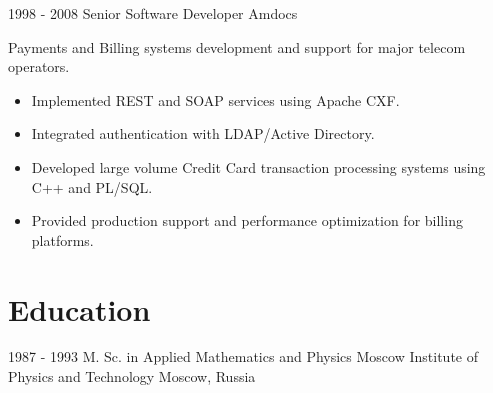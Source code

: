 \documentclass[10pt,a4paper,sans]{moderncv}   %
\begin{document}
\cventry
  {1998 - 2008}
  {Senior Software Developer}
  {Amdocs}
  {}{}
  {
    \vspace{0.5em}
    Payments and Billing systems development and support for major telecom operators.
    \begin{itemize}
      \item Implemented REST and SOAP services using Apache CXF.
      \item Integrated authentication with LDAP/Active Directory.
      \item Developed large volume Credit Card transaction processing systems using C++ and PL/SQL.
      \item Provided production support and performance optimization for billing platforms.
    \end{itemize}
    \vspace{1em}
  }




\section{Education}

\cventry
  {1987 - 1993}
  {M. Sc. in Applied Mathematics and Physics}
  {Moscow Institute of Physics and Technology}
  {Moscow, Russia}
  {}
  {}

%
%
\end{document}
